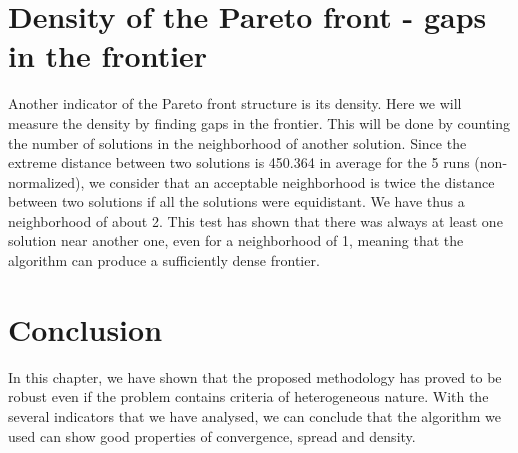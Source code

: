 \section{Density of the Pareto front - gaps in the frontier}
Another indicator of the Pareto front structure is its density. Here we will measure the density by finding gaps in the frontier. This will be done by counting the number of solutions in the neighborhood of another solution. Since the extreme distance between two solutions is 450.364 in average for the 5 runs (non-normalized), we consider that an acceptable neighborhood is twice the distance between two solutions if all the solutions were equidistant. We have thus a neighborhood of about 2. This test has shown that there was always at least one solution near another one, even for a neighborhood of 1, meaning that the algorithm can produce a sufficiently dense frontier.



\section{Conclusion}
In this chapter, we have shown that the proposed methodology has proved to be robust even if the problem contains criteria of heterogeneous nature. With the several indicators that we have analysed, we can conclude that the algorithm we used can show good properties of convergence, spread and density.

